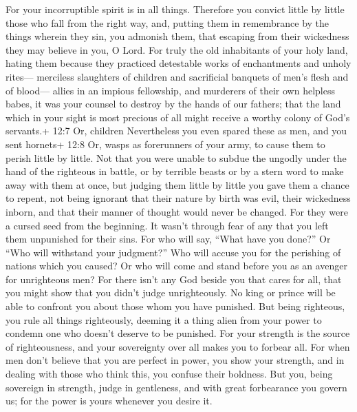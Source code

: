  For your incorruptible spirit is in all things.
 Therefore you convict little by little those who fall from
the right way, and, putting them in remembrance by the things wherein
they sin, you admonish them, that escaping from their wickedness they
may believe in you, O Lord.  For truly the old inhabitants
of your holy land,  hating them because they practiced
detestable works of enchantments and unholy rites--- 
merciless slaughters of children and sacrificial banquets of men's flesh
and of blood---  allies in an impious fellowship, and
murderers of their own helpless babes, it was your counsel to destroy by
the hands of our fathers;  that the land which in your sight
is most precious of all might receive a worthy colony of God's
servants.+ 12:7 Or, children  Nevertheless you even spared
these as men, and you sent hornets+ 12:8 Or, wasps as forerunners of
your army, to cause them to perish little by little.  Not
that you were unable to subdue the ungodly under the hand of the
righteous in battle, or by terrible beasts or by a stern word to make
away with them at once,  but judging them little by little
you gave them a chance to repent, not being ignorant that their nature
by birth was evil, their wickedness inborn, and that their manner of
thought would never be changed.  For they were a cursed
seed from the beginning. It wasn't through fear of any that you left
them unpunished for their sins.  For who will say, ``What
have you done?'' Or ``Who will withstand your judgment?'' Who will
accuse you for the perishing of nations which you caused? Or who will
come and stand before you as an avenger for unrighteous men?
 For there isn't any God beside you that cares for all,
that you might show that you didn't judge unrighteously. 
No king or prince will be able to confront you about those whom you have
punished.  But being righteous, you rule all things
righteously, deeming it a thing alien from your power to condemn one who
doesn't deserve to be punished.  For your strength is the
source of righteousness, and your sovereignty over all makes you to
forbear all.  For when men don't believe that you are
perfect in power, you show your strength, and in dealing with those who
think this, you confuse their boldness.  But you, being
sovereign in strength, judge in gentleness, and with great forbearance
you govern us; for the power is yours whenever you desire it.
